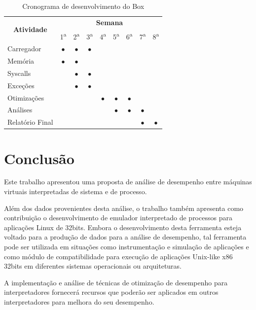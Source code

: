 \documentclass[11pt,twoside]{article}
\begin{document}
\begin{table}[h]
\centering
\begin{tabular}{|l|c|c|c|c|c|c|c|c|} \hline
\multicolumn{1}{|c|}{\multirow{2}{*}{\textbf{Atividade}}} & \multicolumn{8}{c|}{\textbf{Semana}} \\ \cline{2-9}
\multicolumn{1}{|c|}{} & 1\textsuperscript{a} & 2\textsuperscript{a} & 3\textsuperscript{a} & 4\textsuperscript{a} & 5\textsuperscript{a} & 6\textsuperscript{a} & 7\textsuperscript{a} & 8\textsuperscript{a} \\ \hline
Carregador  	& $\bullet$ & $\bullet$ & $\bullet$ &  &  &  &  &  \\ \hline
Memória     	& $\bullet$ & $\bullet$ & &  &  &  &  &  \\ \hline
Syscalls    	&  & $\bullet$ & $\bullet$ &  &  &  &  &  \\ \hline
Exceções    	&  & $\bullet$ & $\bullet$ &  &  &  &  &  \\ \hline
Otimizações 	&  &  &  & $\bullet$ & $\bullet$ & $\bullet$ &  &  \\ \hline
Análises    	&  &  &  &  & $\bullet$ & $\bullet$ & $\bullet$ &  \\ \hline
Relatório Final	&  &  &  &  &  &  & $\bullet$ & $\bullet$ \\ \hline
\end{tabular}
\caption{Cronograma de desenvolvimento do Box}
\label{tab:cronograma}
\end{table}






\section{Conclusão}  \label{sec:conclusao}

Este trabalho apresentou uma proposta de análise de desempenho entre máquinas virtuais interpretadas de sistema e de processo.

Além dos dados provenientes desta análise, o trabalho também apresenta como contribuição o desenvolvimento de emulador interpretado de processos para aplicações Linux de 32bits.
Embora o desenvolvimento desta ferramenta esteja voltado para a produção de dados para a análise de desempenho, tal ferramenta pode ser utilizada em situações como instrumentação e simulação de aplicações e como 
módulo de compatibilidade para execução de aplicações Unix-like x86 32bits em diferentes sistemas operacionais ou arquiteturas.

A implementação e análise de técnicas de otimização de desempenho para interpretadores fornecerá recursos que poderão ser aplicados em outros interpretadores para melhora do seu desempenho. 


\end{document}
